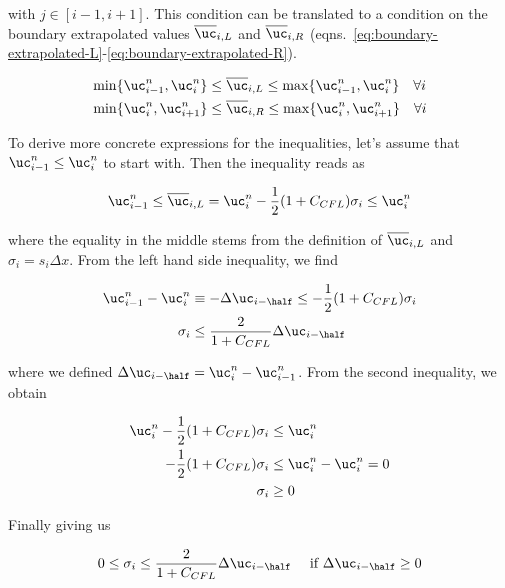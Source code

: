 with $j \in [i-1, i+1]$.
This condition can be translated to a condition on the boundary extrapolated values
$\overline{\uc}_{i,L}$ and $\overline{\uc}_{i,R}$
(eqns.~\ref{eq:boundary-extrapolated-L}-\ref{eq:boundary-extrapolated-R}).

\begin{align}
    \min \{ \uc_{i-1}^n, \uc_i^n \} &\leq \overline{\uc}_{i,L} \leq \max \{ \uc_{i-1}^n, \uc_i^n \}
\quad \forall i \\
    \min \{ \uc_{i}^n, \uc_{i+1}^n \} &\leq \overline{\uc}_{i,R} \leq
    \max \{ \uc_{i}^n, \uc_{i+1}^n \} \quad \forall i
\end{align}

To derive more concrete expressions for the inequalities, let's assume that $\uc_{i-1}^n \leq
\uc_i^n$ to start with. Then the inequality reads as

\begin{align}
    \uc_{i-1}^n \leq \overline{\uc}_{i,L} = \uc_i^n - \frac{1}{2}(1 + C_{CFL}) \sigma_i \leq \uc_i^n
\end{align}

where the equality in the middle stems from the definition of $\overline{\uc}_{i,L}$ and $\sigma_i
= s_i \Delta x$. From the left hand side inequality, we find

\begin{align}
    \uc_{i-1}^n - \uc_{i}^n &\equiv -\Delta \uc_{i-\half} \leq - \frac{1}{2}(1 + C_{CFL}) \sigma_i \\
    \sigma_i &\leq \frac{2}{1 + C_{CFL}} \Delta \uc_{i-\half}
\end{align}

where we defined $\Delta \uc_{i-\half} = \uc_{i}^n - \uc_{i-1}^n$. From the second inequality, we
obtain

\begin{align}
    \uc_{i}^n - \frac{1}{2}(1 + C_{CFL}) \sigma_i &\leq \uc_i^n\\
    - \frac{1}{2}(1 + C_{CFL}) \sigma_i &\leq \uc_i^n - \uc_i^n = 0\\
    \sigma_i &\geq 0
\end{align}

Finally giving us

\begin{align}
 0 \leq \sigma_i \leq \frac{2}{1 + C_{CFL}} \Delta \uc_{i-\half} &&
 \text{ if } \Delta \uc_{i-\half} \geq 0
\end{align}

